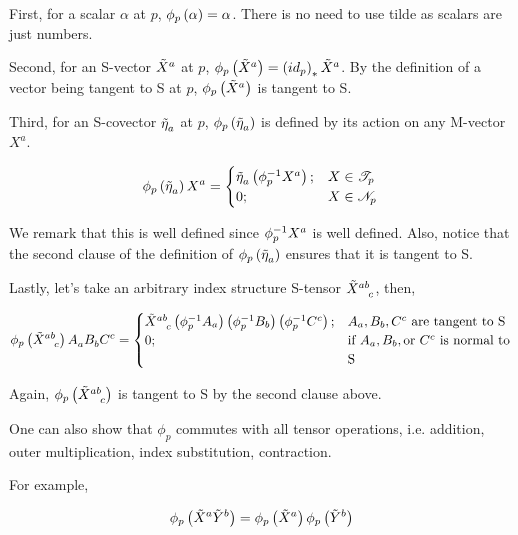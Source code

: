 First, for a scalar $ \alpha$ at $p$, $ \phi_{p} \left(  \alpha \right)= \alpha$. There is no need to use tilde as scalars are just numbers. 

Second, for an S-vector $ \tt{ \tilde{X}}{a}{}$ at $p$, $ \phi_{p} \lera{ \tt{ \tilde{X}}{a}{}} = \lera{ id_p}_* \tt{ \tilde{X}}{a}{}$. By the definition of a vector being tangent to S at $p$, $ \phi_p \lera{ \tt{ \tilde{X}}{a}{}}$ is tangent to S. 

Third, for an S-covector $ \tt{ \tilde{ \eta}}{}{a} $ at $p$, $ \phi_{p} \lera{ \tt{ \tilde{ \eta}}{}{a}}$ is defined by its action on any M-vector $ X^a$. 
 
\[
\phi_{p} \lera{ \tt{ \tilde{ \eta}}{}{a}} \tt{X}{a}{}=
\begin{cases}
 \tt{ \tilde{ \eta}}{}{a} \left(\phi_{p}^{-1} X^a \right); &  X \in \mathscr{T}_p \\
0; & X \in \mathscr{N}_p \\
\end{cases}
\]


We remark that this is well defined since $ \phi_{p}^{-1} \tt{X}{a}{}$ is well defined.  Also, notice that the second clause of the definition of $ \phi_p \lera{ \tt{\tilde{ \eta}}{}{a}}$ ensures that it is tangent to S.


Lastly, let's take an arbitrary index structure S-tensor $ \tt{ \tilde{X}}{ab}{c}$, then,

\[
\phi_{p} \lera{ \tt{ \tilde{X}}{ab}{c}} \tt{A}{}{a} \tt{ B}{}{b} \tt{ C}{c}{} = 
\begin{cases}
    \tt{ \tilde{X}}{ab}{c} \lera{ \phi_{p}^{-1}A_a} \lera{ \phi_{p}^{-1} B_b} \lera{ \phi_{p}^{-1}C^c } ; & A_a, B_b ,C^c \text{ are tangent to S}\\
    0 ; & \text{if } A_a, B_b ,\text{or }C^c  \text{ is normal to} \\ & \text{S}\\
\end{cases}
\]

Again, $ \phi_p \lera{ \tt{ \tilde{X}}{ab}{c}}$ is tangent to S by the second clause above. 

One can also show that $ \phi_p$ commutes with all tensor operations, i.e. addition, outer multiplication, index substitution, contraction.

For example,

\begin{align*}
    \phi_p \lera{ \tt{ \tilde{X}}{a }{} \tt{ \tilde{Y}}{b}{}} = \phi_p \lera{ \tt{ \tilde{X}}{a}{}} \phi_{p} \lera{\tt{ \tilde{Y}}{b}{}} 
\end{align*}



